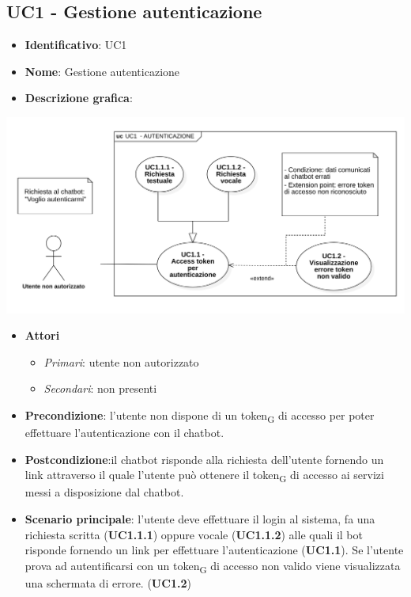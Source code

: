 \subsection{UC1 - Gestione autenticazione}
\begin{itemize}
    \item \textbf{Identificativo}: UC1
    \item \textbf{Nome}: Gestione autenticazione
    \item \textbf{Descrizione grafica}:
\end{itemize}

\begin{center}
    \includegraphics[scale=0.50]{images/UC1.png} 
\end{center}

 \begin{itemize}
    \item \textbf{Attori}
 \begin{itemize} 
    \item \textit{Primari}: utente non autorizzato
    \item \textit{Secondari}: non presenti
 \end{itemize}
 \item \textbf{Precondizione}: l'utente non dispone di un token\textsubscript{G} di accesso per poter effettuare l'autenticazione con il chatbot.
 \item \textbf{Postcondizione}:il chatbot risponde alla richiesta dell'utente fornendo un link attraverso il quale l'utente può ottenere il token\textsubscript{G} di accesso ai servizi messi a disposizione dal chatbot.
 \item \textbf{Scenario principale}: l'utente deve effettuare il login al sistema, fa una richiesta scritta (\textbf{UC1.1.1}) oppure vocale (\textbf{UC1.1.2}) alle quali il bot risponde fornendo un link per effettuare l'autenticazione (\textbf{UC1.1}). Se l'utente prova ad autentificarsi con un token\textsubscript{G} di accesso non valido viene visualizzata una schermata di errore. (\textbf{UC1.2})
\end{itemize}
\newpage

